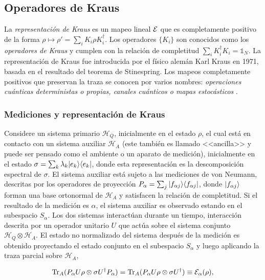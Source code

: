 \subsection{Operadores de Kraus}

 La \textit{representación de Kraus} es un mapeo lineal $\mathcal{E}$ que es completamente positivo de la forma $\rho \mapsto \rho'=\sum_i K_i\rho K_i^\dagger$. Los operadores $\{K_i\}$ son conocidos como los \textit{operadores de Kraus} y cumplen con la relación de completitud $\sum_i K_i^\dagger K_i=\mathds{1}_N$. La representación de Kraus fue introducida por el físico alemán Karl Kraus en 1971, basada en el resultado del teorema de Stinespring. Los mapeos completamente positivos que preservan la traza se conocen por varios nombres: \textit{operaciones cuánticas deterministas o propias, canales cuánticos o mapas estocásticos} {\cite{2007geometry}}.


\subsubsection{Mediciones y representación de Kraus}\label{Medicion_RepresentacionDeKraus}

Considere un sistema primario $\mathcal{H}_Q$, inicialmente en el estado $\rho$,  el cual está en contacto con un sistema auxiliar $\mathcal{H}_A$ (este también es llamado <<ancilla>> y puede ser pensado como el ambiente o un aparato de medición), inicialmente en el estado $\sigma=\sum_k \lambda_k |e_k\rangle \langle e_k|$, donde esta representación es la descomposición espectral de $\sigma$. El sistema auxiliar está sujeto a las mediciones de von Neumann, descritas por los operadores de proyección $P_\alpha=\sum_j |f_{\alpha j}\rangle \langle f_{\alpha j}|$,  donde $|f_{\alpha j}\rangle$ forman una base ortonormal de $\mathcal{H}_A$ y satisfacen la relación de completitud. Si el resultado de la medición es $\alpha$, el sistema auxiliar es observado estando en el subespacio $S_\alpha$. Los dos sistemas interactúan durante un tiempo, interacción descrita por un operador unitario $U$ que actúa sobre el sistema conjunto $\mathcal{H}_Q\otimes \mathcal{H}_A$. El estado no normalizado del sistema después de la medición es obtenido proyectando el estado conjunto en el subespacio $S_\alpha$ y luego aplicando la traza parcial sobre $\mathcal{H}_A$,

\begin{equation}\label{measurement_model}
    {\rm Tr}_A(P_\alpha U \rho \otimes \sigma U^\dagger P_\alpha)= {\rm Tr}_A(P_\alpha U \rho \otimes \sigma U^\dagger)\equiv \mathcal{E}_\alpha(\rho),
\end{equation}


